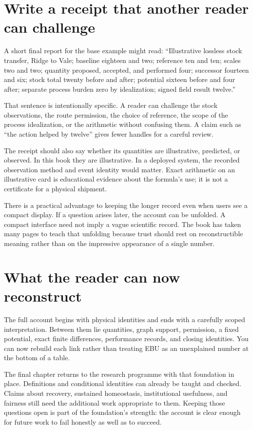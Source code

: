 \section{Write a receipt that another reader can challenge}

A short final report for the base example might read: ``Illustrative lossless stock transfer, Ridge to Vale; baseline eighteen and two; reference ten and ten; scales two and two; quantity proposed, accepted, and performed four; successor fourteen and six; stock total twenty before and after; potential sixteen before and four after; separate process burden zero by idealization; signed field result twelve.''

That sentence is intentionally specific. A reader can challenge the stock observations, the route permission, the choice of reference, the scope of the process idealization, or the arithmetic without confusing them. A claim such as ``the action helped by twelve'' gives fewer handles for a careful review.

The receipt should also say whether its quantities are illustrative, predicted, or observed. In this book they are illustrative. In a deployed system, the recorded observation method and event identity would matter. Exact arithmetic on an illustrative card is educational evidence about the formula's use; it is not a certificate for a physical shipment.

There is a practical advantage to keeping the longer record even when users see a compact display. If a question arises later, the account can be unfolded. A compact interface need not imply a vague scientific record. The book has taken many pages to teach that unfolding because trust should rest on reconstructible meaning rather than on the impressive appearance of a single number.

\section{What the reader can now reconstruct}

The full account begins with physical identities and ends with a carefully scoped interpretation. Between them lie quantities, graph support, permission, a fixed potential, exact finite differences, performance records, and closing identities. You can now rebuild each link rather than treating EBU as an unexplained number at the bottom of a table.

The final chapter returns to the research programme with that foundation in place. Definitions and conditional identities can already be taught and checked. Claims about recovery, sustained homeostasis, institutional usefulness, and fairness still need the additional work appropriate to them. Keeping those questions open is part of the foundation's strength: the account is clear enough for future work to fail honestly as well as to succeed.

